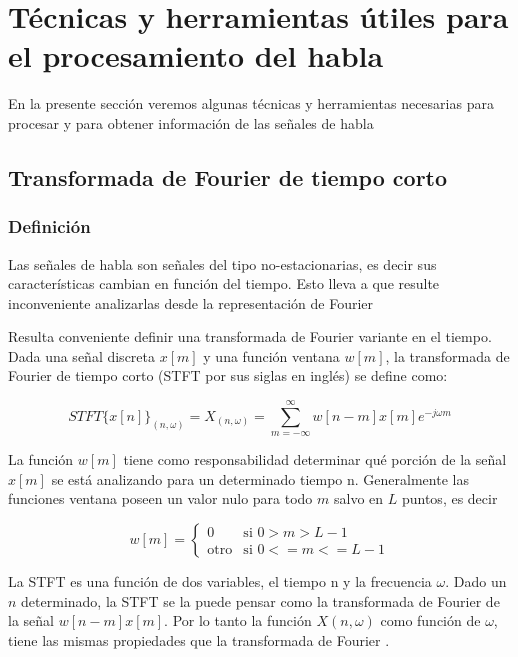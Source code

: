 \section{Técnicas y herramientas útiles para el procesamiento del habla}

En la presente sección veremos algunas técnicas y herramientas necesarias para procesar y para obtener información de las señales de habla

\subsection{Transformada de Fourier de tiempo corto}
\label{sec:stft}

\subsubsection{Definición}

Las señales de habla son señales del tipo no-estacionarias, es decir sus características cambian en función del tiempo. Esto lleva a que resulte inconveniente analizarlas desde la representación de Fourier \cite{spoken_language_processing,speech_enhancement_theory_and_practice}

Resulta conveniente definir una transformada de Fourier variante en el tiempo. Dada una señal discreta $x[m]$ y una función ventana $w[m]$, la transformada de Fourier de tiempo corto (STFT por sus siglas en inglés) se define como:

\begin{equation*}
	STFT\{x[n]\}_{(n, \omega)} = X_{(n, \omega)} = \sum_{m=-\infty}^{\infty} w[n-m]x[m]e^{-j \omega m}
\end{equation*}

La función $w[m]$ tiene como responsabilidad determinar qué porción de la señal $x[m]$ se está analizando para un determinado tiempo n. Generalmente las funciones ventana poseen un valor nulo para todo $m$ salvo en $L$ puntos, es decir

\begin{equation*}
	w[m] = 
	\begin{cases}
		0 & \text{si $0 > m > L - 1$} \\
		\text{otro} & \text{si $0 <= m <= L - 1$}
	\end{cases}
\end{equation*}

La STFT es una función de dos variables, el tiempo n y la frecuencia $\omega$. Dado un $n$ determinado, la STFT se la puede pensar como la transformada de Fourier de la señal $w[n-m] x[m]$. Por lo tanto la función $X(n,\omega)$ como función de $\omega$, tiene las mismas propiedades que la transformada de Fourier \cite{oppenheim_schafer}.

